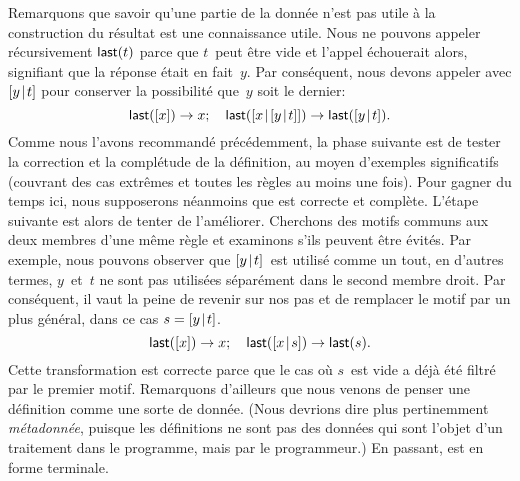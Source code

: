 Remarquons que savoir qu'une partie de la donnée n'est pas utile à la
construction du résultat est une connaissance utile. Nous ne pouvons
appeler récursivement \(\textsf{last}(t)\) parce que \(t\)~peut être vide
et l'appel échouerait alors, signifiant que la réponse était en
fait~\(y\). Par conséquent, nous devons appeler avec \([{y}\!\mid\!{t}]\)
pour conserver la possibilité que~\(y\) soit le dernier:
\begin{equation*}
\textsf{last}([x]) \rightarrow x;\quad
\textsf{last}([{x}\!\mid\!{[{y}\!\mid\!{t}]}]) \rightarrow \textsf{last}([{y}\!\mid\!{t}]).
\end{equation*}
Comme nous l'avons recommandé précédemment, la phase suivante est de
tester la correction et la complétude de la définition, au moyen
d'ex\-em\-ples significatifs (couvrant des cas extrêmes et toutes les
règles au moins une fois). Pour gagner du temps ici, nous supposerons
néanmoins que  est correcte et complète. L'étape suivante
est alors de tenter de l'améliorer. Cherchons des motifs communs aux
deux membres d'une même règle et examinons s'ils peuvent être
évités. Par exemple, nous pouvons observer que \([{y}\!\mid\!{t}]\)~est
utilisé comme un tout, en d'autres termes, \(y\)~et~\(t\) ne sont pas
utilisées séparément dans le second membre droit. Par conséquent, il
vaut la peine de revenir sur nos pas et de remplacer le motif par un
plus général, dans ce cas \(s = [{y}\!\mid\!{t}]\).
\begin{equation*}
\textsf{last}([x]) \rightarrow x;\quad
\textsf{last}([{x}\!\mid\!{s}]) \rightarrow \textsf{last}(s).
\end{equation*}
Cette transformation est correcte parce que le cas où \(s\)~est vide a
déjà été filtré par le premier motif. Remarquons d'ailleurs que nous
venons de penser une définition comme une sorte de donnée. (Nous
devrions dire plus pertinemment \emph{métadonnée}, puisque les
définitions ne sont pas des données qui sont l'objet d'un traitement
dans le programme, mais par le programmeur.) En passant, 
est en forme terminale.


